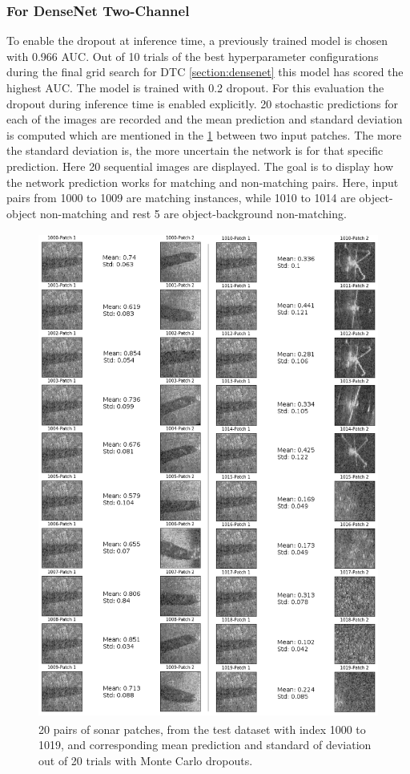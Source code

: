 \subsubsection{For DenseNet Two-Channel}
To enable the dropout at inference time, a previously trained model is chosen with 0.966 AUC. Out of 10 trials of the best hyperparameter configurations during the final grid search for DTC \ref{section:densenet} this
model has scored the highest AUC. The model is trained with 0.2 dropout. For this evaluation the dropout during inference time 
is enabled explicitly. 20 stochastic predictions for each of the images are recorded and the mean prediction and standard deviation is computed which are mentioned in the \ref{fig:prediction_images_MC} between two input patches. 
The more the standard deviation is, the more uncertain the network is for 
that specific prediction. Here 20 sequential images are displayed. The goal is to display how the network prediction works for matching and non-matching pairs. Here, input pairs from 1000 to 1009 are matching instances, while 1010 to 1014 are 
object-object non-matching and rest 5 are object-background non-matching.

\begin{figure}[htb]
\centering
\includegraphics[width=14cm,height=16cm]{images/densenet/prediction_images_MC_grey}
\caption{20 pairs of sonar patches, from the test dataset with index 1000 to 1019, and corresponding mean prediction and standard of deviation out of 20 trials with Monte Carlo dropouts.}
\label{fig:prediction_images_MC}
\end{figure}

